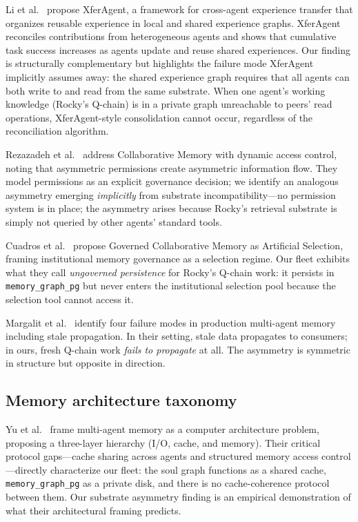 \documentclass[11pt]{article}
\begin{document}
Li et al.\ \citep{li2026xferagent} propose XferAgent, a framework for cross-agent
experience transfer that organizes reusable experience in local and shared experience
graphs. XferAgent reconciles contributions from heterogeneous agents and shows that
cumulative task success increases as agents update and reuse shared experiences.
Our finding is structurally complementary but highlights the failure mode XferAgent
implicitly assumes away: the shared experience graph requires that all agents can
both write to and read from the same substrate. When one agent's working knowledge
(Rocky's Q-chain) is in a private graph unreachable to peers' read operations,
XferAgent-style consolidation cannot occur, regardless of the reconciliation algorithm.

Rezazadeh et al.\ \citep{rezazadeh2025collaborative} address Collaborative Memory
with dynamic access control, noting that asymmetric permissions create asymmetric
information flow. They model permissions as an explicit governance decision; we
identify an analogous asymmetry emerging \emph{implicitly} from substrate
incompatibility---no permission system is in place; the asymmetry arises because
Rocky's retrieval substrate is simply not queried by other agents' standard tools.

Cuadros et al.\ \citep{cuadros2026governed} propose Governed Collaborative Memory
as Artificial Selection, framing institutional memory governance as a selection
regime. Our fleet exhibits what they call \emph{ungoverned persistence} for
Rocky's Q-chain work: it persists in \texttt{memory\_graph\_pg} but never enters
the institutional selection pool because the selection tool cannot access it.

Margalit et al.\ \citep{margalit2026memclaw} identify four failure modes in
production multi-agent memory including stale propagation. In their setting,
stale data propagates to consumers; in ours, fresh Q-chain work \emph{fails to
propagate} at all. The asymmetry is symmetric in structure but opposite in
direction.

\subsection{Memory architecture taxonomy}

Yu et al.\ \citep{yu2026architecture} frame multi-agent memory as a computer
architecture problem, proposing a three-layer hierarchy (I/O, cache, and memory).
Their critical protocol gaps---cache sharing across agents and structured memory
access control---directly characterize our fleet: the soul graph functions as a
shared cache, \texttt{memory\_graph\_pg} as a private disk, and there is no
cache-coherence protocol between them. Our substrate asymmetry finding is an
empirical demonstration of what their architectural framing predicts.
\end{document}
